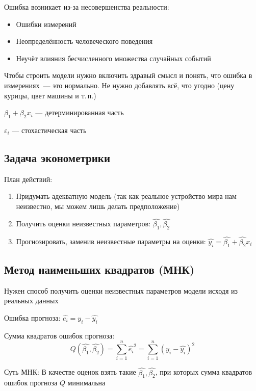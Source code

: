 \documentclass[12pt,a4paper]{article}
\numberwithin{equation}{section}
\theoremstyle{plain}
\theoremstyle{definition}
\theoremstyle{remark}
\begin{document}
Ошибка возникает из-за несовершенства реальности:

\begin{itemize}
    \item Ошибки измерений
    \item Неопределённость человеческого поведения
    \item Неучёт влияния бесчисленного множества случайных событий
\end{itemize}

Чтобы строить модели нужно включить здравый смысл и понять, что ошибка в измерениях~— это нормально. Не нужно добавлять всё, что угодно (цену курицы, цвет машины и т.\,п.)

$\beta_1 + \beta_2 x_i$ — детерминированная часть

$\varepsilon_i$ — стохастическая часть

\subsection{Задача эконометрики}

План действий:

\begin{enumerate}
    \item Придумать адекватную модель (так как реальное устройство мира нам неизвестно, мы можем лишь делать предположение)
    \item Получить оценки неизвестных параметров: $\hat{\beta_1}, \hat{\beta_2}$
    \item Прогнозировать, заменив неизвестные параметры на оценки: $\hat{y_i} = \hat{\beta_1} + \hat{\beta_2}x_i$
\end{enumerate}

\subsection{Метод наименьших квадратов (МНК)}

Нужен способ получить оценки неизвестных параметров модели исходя из реальных данных

Ошибка прогноза: $\hat{e_i} = y_i - \hat{y_i}$

Сумма квадратов ошибок прогноза:
$$
    Q \left(\hat{\beta_1}, \hat{\beta_2}\right) = \sum_{i = 1}^n \hat{e_i}^2 = \sum_{i = 1}^n \left(y_i - \hat{y_i}\right)^2
$$

Суть МНК: В качестве оценок взять такие $\hat{\beta_1}, \hat{\beta_2}$, при которых сумма квадратов ошибок прогноза $Q$ минимальна
\end{document}
